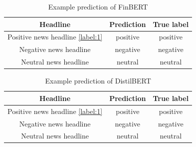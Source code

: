 \begin{table}[!ht]
    \centering
    \caption{Example prediction of FinBERT}
    \begin{tabular}{ccc}
      \toprule
          Headline &  Prediction & True label \\
          \midrule
          Positive news headline \ref{label:1} & positive & positive \\
          Negative news headline & negative & negative \\
          Neutral news headline & neutral & neutral \\
          \bottomrule
    \end{tabular}
  \end{table}

  \begin{table}[!ht]
    \centering
    \caption{Example prediction of DistilBERT}
    \begin{tabular}{ccc}
      \toprule
          Headline &  Prediction & True label \\
          \midrule
          Positive news headline \ref{label:1} & positive & positive \\
          Negative news headline & negative & negative \\
          Neutral news headline & neutral & neutral \\
          \bottomrule
    \end{tabular}
  \end{table}
\newpage


